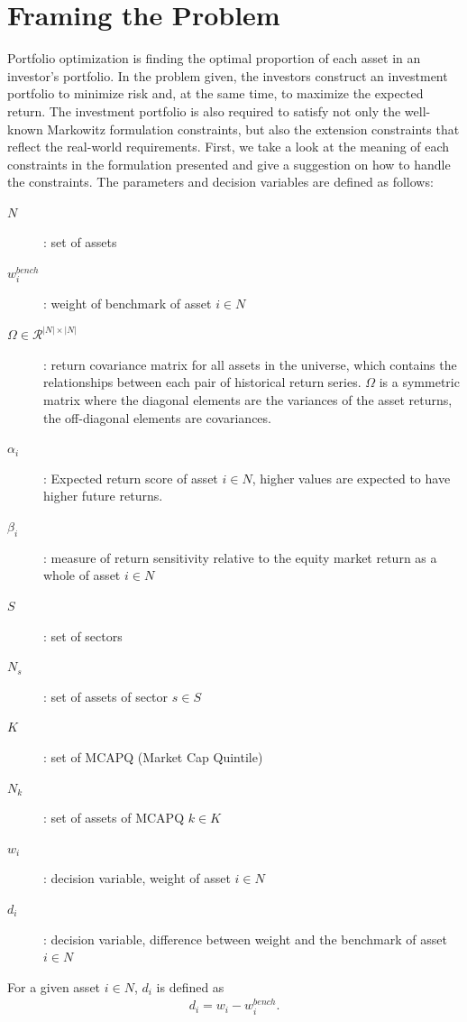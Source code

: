 \documentclass[11pt]{article}
\begin{document}
	\section*{Framing the Problem}
	Portfolio optimization is finding the optimal proportion of each asset in an investor’s portfolio. In the problem given, the investors construct an investment portfolio to minimize risk and, at the same time, to maximize the expected return. The investment portfolio is also required to satisfy not only the well-known Markowitz formulation constraints, but also the extension constraints that reflect the real-world requirements. First, we take a look at the meaning of each constraints in the formulation presented and give a suggestion on how to handle the constraints.
	The parameters and decision variables are defined as follows:
	\begin{description}
		\item[$N$]: set of assets
		\item[$w^{bench}_i$]: weight of benchmark of asset $i \in N$
		\item[$\Omega \in \mathcal{R}^{|N|\times |N|}$]: return covariance matrix for all assets in the universe, which contains the relationships between each pair of historical return series. $\Omega$ is a symmetric matrix where the diagonal elements are the variances of the asset returns, the off-diagonal elements are covariances.
		\item[$\alpha_i$]: Expected return score of asset $i \in N$, higher values are expected to have higher future returns.
		\item[$\beta_i$]: measure of return sensitivity relative to the equity market return as a whole of asset $i \in N$ 
		\item[$S$]: set of sectors
		\item[$N_s$]: set of assets of sector $s \in S$
		\item[$K$]: set of MCAPQ (Market Cap Quintile)
		\item[$N_k$]: set of assets of MCAPQ $k \in K$
		\item[$w_i$]: decision variable, weight of asset $i \in N$
		\item[$d_i$]: decision variable, difference between weight and the benchmark of asset $i \in N$
	\end{description}
	
	
	For a given asset $i \in N$, $d_i$ is defined as
	\begin{align}
	d_i = w_i - w^{bench}_i. \label{eq:P:activeweight}
	\end{align}
	
\end{document}

